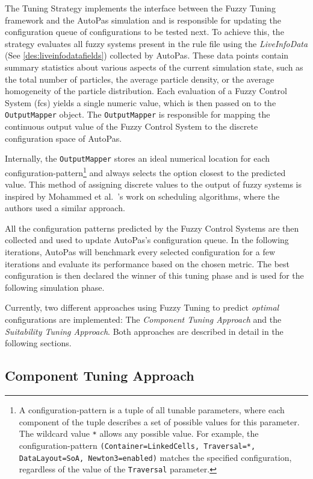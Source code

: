 The Tuning Strategy implements the interface between the Fuzzy Tuning framework and the AutoPas simulation and is responsible for updating the configuration queue of configurations to be tested next. To achieve this, the strategy evaluates all fuzzy systems present in the rule file using the \emph{LiveInfoData} (See \ref{des:liveinfodatafields}) collected by AutoPas. These data points contain summary statistics about various aspects of the current simulation state, such as the total number of particles, the average particle density, or the average homogeneity of the particle distribution. Each evaluation of a Fuzzy Control System (\gls{fcs}) yields a single numeric value, which is then passed on to the \texttt{OutputMapper} object. The \texttt{OutputMapper} is responsible for mapping the continuous output value of the Fuzzy Control System to the discrete configuration space of AutoPas.

Internally, the \texttt{OutputMapper} stores an ideal numerical location for each configuration-pattern\footnote{A configuration-pattern is a tuple of all tunable parameters, where each component of the tuple describes a set of possible values for this parameter. The wildcard value \texttt{*} allows any possible value. For example, the configuration-pattern \texttt{(Container=LinkedCells, Traversal=*, DataLayout=SoA, Newton3=enabled)} matches the specified configuration, regardless of the value of the \texttt{Traversal} parameter.} and always selects the option closest to the predicted value. This method of assigning discrete values to the output of fuzzy systems is inspired by Mohammed et al.~\cite{Mohammed2022}'s work on scheduling algorithms, where the authors used a similar approach.

All the configuration patterns predicted by the Fuzzy Control Systems are then collected and used to update AutoPas's configuration queue. In the following iterations, AutoPas will benchmark every selected configuration for a few iterations and evaluate its performance based on the chosen metric. The best configuration is then declared the winner of this tuning phase and is used for the following simulation phase.

Currently, two different approaches using Fuzzy Tuning to predict \emph{optimal} configurations are implemented: The \emph{Component Tuning Approach} and the \emph{Suitability Tuning Approach}. Both approaches are described in detail in the following sections.


\subsection{Component Tuning Approach}
\label{sec:componentTuningApproach}

